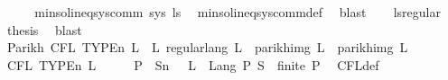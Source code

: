 \begin{isabellebody}
\isanewline
\ \ \isamarkupfalse%
\ \isamarkupfalse%
\ {\isachardoublequoteopen}min{\isacharunderscore}{\kern0pt}sol{\isacharunderscore}{\kern0pt}ineq{\isacharunderscore}{\kern0pt}sys{\isacharunderscore}{\kern0pt}comm\ sys\ {\isacharquery}{\kern0pt}ls{\isacharprime}{\kern0pt}{\isachardoublequoteclose}\ \isamarkupfalse%
\ min{\isacharunderscore}{\kern0pt}sol{\isacharunderscore}{\kern0pt}ineq{\isacharunderscore}{\kern0pt}sys{\isacharunderscore}{\kern0pt}comm{\isacharunderscore}{\kern0pt}def\ \isamarkupfalse%
\ blast\isanewline
\ \ \isamarkupfalse%
\ ls{\isacharprime}{\kern0pt}{\isacharunderscore}{\kern0pt}regular\ \isamarkupfalse%
\ {\isacharquery}{\kern0pt}thesis\ \isamarkupfalse%
\ blast\isanewline
{}\isamarkupfalse%
%
\endisatagproof
{\isafoldproof}%
%
\isadelimproof
%
\endisadelimproof
%
\isadelimdocument
%
\endisadelimdocument
%
\isatagdocument
%
\isamarkuptrue%
%
\endisatagdocument
{\isafolddocument}%
%
\isadelimdocument
%
\endisadelimdocument
{}\isamarkupfalse%
\ Parikh{\isacharcolon}{\kern0pt}\ {\isachardoublequoteopen}CFL\ {\isacharparenleft}{\kern0pt}TYPE{\isacharparenleft}{\kern0pt}{\isacharprime}{\kern0pt}n{\isacharparenright}{\kern0pt}{\isacharparenright}{\kern0pt}\ L\ {\isasymLongrightarrow}\ {\isasymexists}L{\isacharprime}{\kern0pt}{\isachardot}{\kern0pt}\ regular{\isacharunderscore}{\kern0pt}lang\ L{\isacharprime}{\kern0pt}\ {\isasymand}\ parikh{\isacharunderscore}{\kern0pt}img\ L\ {\isacharequal}{\kern0pt}\ parikh{\isacharunderscore}{\kern0pt}img\ L{\isacharprime}{\kern0pt}{\isachardoublequoteclose}\isanewline
%
\isadelimproof
%
\endisadelimproof
%
\isatagproof
{}\isamarkupfalse%
\ {\isacharminus}{\kern0pt}\isanewline
\ \ \isamarkupfalse%
\ {\isachardoublequoteopen}CFL\ {\isacharparenleft}{\kern0pt}TYPE{\isacharparenleft}{\kern0pt}{\isacharprime}{\kern0pt}n{\isacharparenright}{\kern0pt}{\isacharparenright}{\kern0pt}\ L{\isachardoublequoteclose}\isanewline
\ \ \isamarkupfalse%
\ \isamarkupfalse%
\ P\ \ S{\isacharcolon}{\kern0pt}{\isacharcolon}{\kern0pt}{\isacharprime}{\kern0pt}n\ \ {\isacharasterisk}{\kern0pt}{\isacharcolon}{\kern0pt}\ {\isachardoublequoteopen}L\ {\isacharequal}{\kern0pt}\ Lang\ P\ S\ {\isasymand}\ finite\ P{\isachardoublequoteclose}\ \isamarkupfalse%
\ CFL{\isacharunderscore}{\kern0pt}def\ \isamarkupfalse%

\end{isabellebody}
